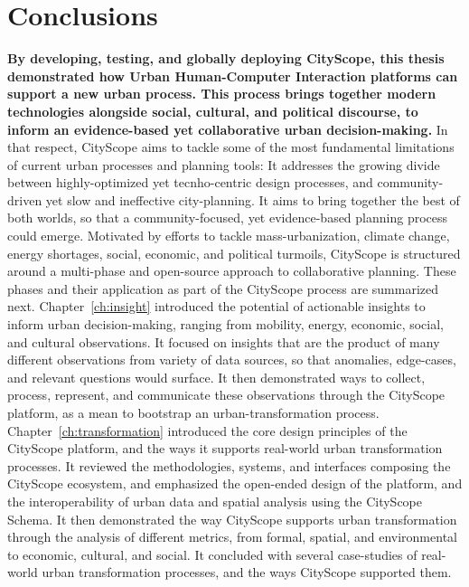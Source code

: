 \chapter*{Conclusions}\label{ch:conclusions}

{
    \textbf{By developing, testing, and globally deploying CityScope, this thesis demonstrated how Urban Human-Computer Interaction platforms can support a new urban process. This process brings together modern technologies alongside social, cultural, and political discourse, to inform an evidence-based yet collaborative urban decision-making.} In that respect, CityScope aims to tackle some of the most fundamental limitations of current urban processes and planning tools: It addresses the growing divide between highly-optimized yet tecnho-centric design processes, and community-driven yet slow and ineffective city-planning. It aims to bring together the best of both worlds, so that a community-focused, yet evidence-based planning process could emerge. Motivated by efforts to tackle mass-urbanization, climate change, energy shortages, social, economic, and political turmoils, CityScope is structured around a multi-phase and open-source approach to collaborative planning. These phases and their application as part of the CityScope process are summarized next.
    \newline
    Chapter~\eqref{ch:insight} introduced the potential of actionable insights to inform urban decision-making, ranging from mobility, energy, economic, social, and cultural observations. It focused on insights that are the product of many different observations from variety of data sources, so that anomalies, edge-cases, and relevant questions would surface. It then demonstrated ways to collect, process, represent, and communicate these observations through the CityScope platform, as a mean to bootstrap an urban-transformation process.
    \newline
    Chapter~\eqref{ch:transformation} introduced the core design principles of the CityScope platform, and the ways it supports real-world urban transformation processes. It reviewed the methodologies, systems, and interfaces composing the CityScope ecosystem, and emphasized the open-ended design of the platform, and the interoperability of urban data and spatial analysis using the CityScope Schema. It then demonstrated the way CityScope supports urban transformation through the analysis of different metrics, from formal, spatial, and environmental to economic, cultural, and social. It concluded with several case-studies of real-world urban transformation processes, and the ways CityScope supported them.
}
